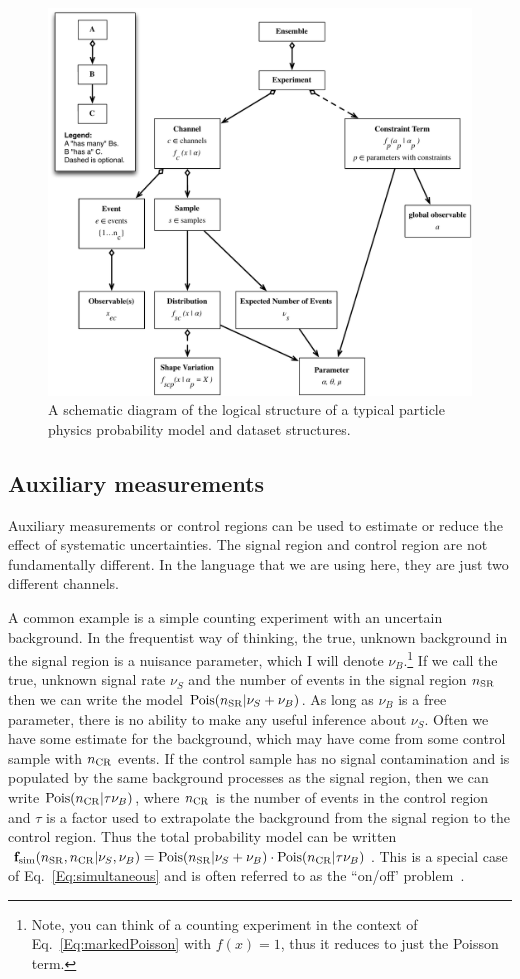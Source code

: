\documentclass{cernrep}
\newcommand{\Pois}{{\ensuremath{\rm Pois}}}
\newcommand{\F}{{\ensuremath{\mathbf{f}}}}
\begin{document}
\begin{figure}[htbp]
\begin{center}
\includegraphics[width=.6\linewidth]{Hierarchy_with_Notation.pdf}
\caption{A schematic diagram of the logical structure of a typical particle physics probability model and dataset structures.}
\label{fig:hierarchy}
\end{center}
\end{figure}

\subsection{Auxiliary measurements}\label{S:AuxMeas}

Auxiliary measurements or control regions can be used to estimate or reduce the effect of systematic uncertainties.  The signal region and control region are not fundamentally different.  In the language that we are using here, they are just two different channels.  

A common example is  a simple counting experiment with an uncertain background.  In the frequentist way of thinking, the true, unknown background in the signal region is a nuisance parameter, which I will denote $\nu_B$.\footnote{Note, you can think of a counting experiment in the context of Eq.~\ref{Eq:markedPoisson} with $f(x)=1$, thus it reduces to just the Poisson term.}  If we call the true, unknown signal rate $\nu_S$ and the number of events in the signal region $n_{\rm SR}$ then we can write the model $\Pois(n_{\rm SR} | \nu_S + \nu_B)$.  As long as $\nu_B$ is a free parameter, there is no ability to make any useful inference about $\nu_S$.  Often we have some estimate for the background, which may have come from some control sample with $n_{\rm CR}$ events.  If the control sample has no signal contamination and is populated by the same background processes as the signal region, then we can write $\Pois(n_{\rm CR}|\tau \nu_B)$, where $n_{\rm CR}$ is the number of events in the control region and $\tau$ is a factor used to extrapolate the background from the signal region to the control region.  Thus the total probability model can be written $\F_{\rm sim}(n_{\rm SR},n_{\rm CR} | \nu_S, \nu_B) = \Pois(n_{\rm SR} | \nu_S + \nu_B)\cdot \Pois(n_{\rm CR}|\tau\nu_B)$.  This is a special case of Eq.~\ref{Eq:simultaneous} and is often referred to as the ``on/off' problem~\cite{Cousins:2008zz}.
\end{document}
